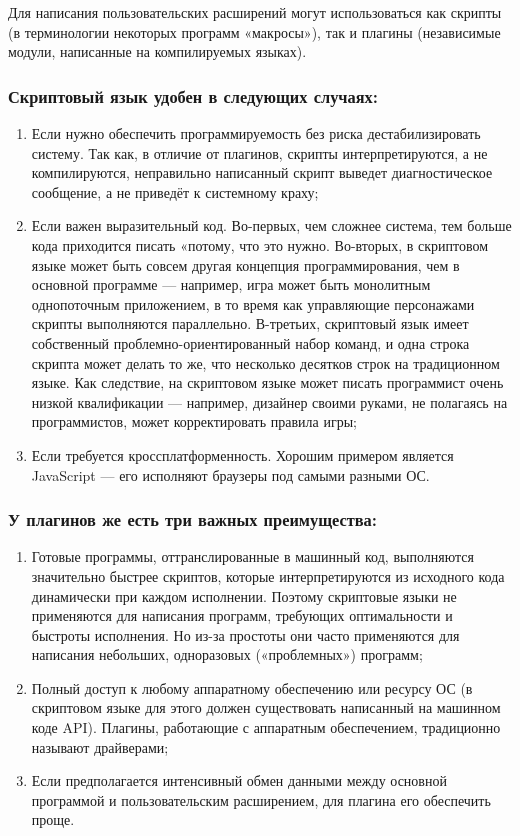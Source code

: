 Для написания пользовательских расширений могут использоваться как скрипты (в терминологии некоторых программ «макросы»), так и плагины (независимые модули, написанные на компилируемых языках).

\subsubsection{Скриптовый язык удобен в следующих случаях:}

\begin{enumerate}
\item Если нужно обеспечить программируемость без риска дестабилизировать систему. Так как, в отличие от плагинов, скрипты интерпретируются, а не компилируются, неправильно написанный скрипт выведет диагностическое сообщение, а не приведёт к системному краху;
\item Если важен выразительный код. Во-первых, чем сложнее система, тем больше кода приходится писать «потому, что это нужно. Во-вторых, в скриптовом языке может быть совсем другая концепция программирования, чем в основной программе — например, игра может быть монолитным однопоточным приложением, в то время как управляющие персонажами скрипты выполняются параллельно. В-третьих, скриптовый язык имеет собственный проблемно-ориентированный набор команд, и одна строка скрипта может делать то же, что несколько десятков строк на традиционном языке. Как следствие, на скриптовом языке может писать программист очень низкой квалификации — например, дизайнер своими руками, не полагаясь на программистов, может корректировать правила игры;
\item Если требуется кроссплатформенность. Хорошим примером является JavaScript — его исполняют браузеры под самыми разными ОС.
\end{enumerate}

\subsubsection{У плагинов же есть три важных преимущества:}

\begin{enumerate}
\item Готовые программы, оттранслированные в машинный код, выполняются значительно быстрее скриптов, которые интерпретируются из исходного кода динамически при каждом исполнении. Поэтому скриптовые языки не применяются для написания программ, требующих оптимальности и быстроты исполнения. Но из-за простоты они часто применяются для написания небольших, одноразовых («проблемных») программ;
\item Полный доступ к любому аппаратному обеспечению или ресурсу ОС (в скриптовом языке для этого должен существовать написанный на машинном коде API). Плагины, работающие с аппаратным обеспечением, традиционно называют драйверами;
\item Если предполагается интенсивный обмен данными между основной программой и пользовательским расширением, для плагина его обеспечить проще.
\end{enumerate}

